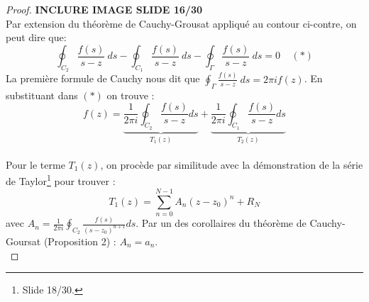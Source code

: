 	
	\begin{proof}
	\textbf{INCLURE IMAGE SLIDE 16/30}\\
	Par extension du théorème de Cauchy-Grousat appliqué au contour ci-contre, on peut dire que:
	\begin{equation}
	\oint_{C_2} \frac{f(s)}{s-z}\ ds -	\oint_{C_1} \frac{f(s)}{s-z}\ ds -\oint_{\Gamma}
	 \frac{f(s)}{s-z}\ ds = 0\ \ \ \ \ (*)
	\end{equation}
	La première formule de Cauchy nous dit que $\oint_\Gamma \frac{f(s)}{s-z}\ ds = 2\pi i f(z)$.
	En substituant dans $(*)$ on trouve :
	\begin{equation}
	f(z) = \underbrace{\dfrac{1}{2\pi i}\oint_{C_2} \frac{f(s)}{s-z}ds}_{T_1(z)} + \underbrace{
	\dfrac{1}{2\pi i}\oint_{C_1} \frac{f(s)}{s-z}ds}_{T_2(z)}
	\end{equation}\ \\
	
	Pour le terme $T_1(z)$, on procède par similitude avec la démonstration de la série de 
	Taylor\footnote{Slide 18/30.} pour trouver :
	\begin{equation}
	T_1(z) = \sum_{n=0}^{N-1} A_n(z-z_0)^n + R_N
	\end{equation}
	avec $A_n = \frac{1}{2\pi i}\oint_{C_2} \frac{f(s)}{(s-z_0)^{n+1}}ds$. Par un des 
	corollaires du théorème de Cauchy-Goursat (Proposition 2) : $A_n = a_n$.\\
	

\end{proof}
